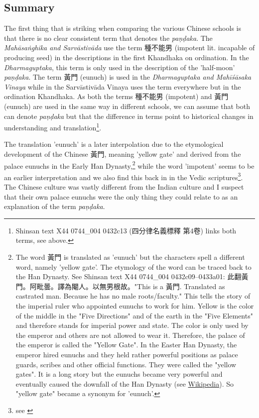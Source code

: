 \subsection{Summary}
The first thing that is striking when comparing the various Chinese schools is that there is no clear consistent term that denotes the {\em paṇḍaka}. The {\em Mahāsaṅghika and Sarvāstivāda} use the term 種不能男 (impotent lit. incapable of producing seed) in the descriptions in the first Khandhaka on ordination. In the {\em Dharmaguptaka}, this term is only used in the description of the 'half-moon' {\em paṇḍaka}. The term 黃門 (eunuch) is used in the {\em Dharmaguptaka and Mahīśāsaka Vinaya} while in the Sarvāstivāda Vinaya uses the term everywhere but in the ordination Khandhaka. As both the terms 種不能男 (impotent) and 黃門 (eunuch) are used in the same way in different schools, we can assume that both can denote {\em paṇḍaka} but that the difference in terms point to historical changes in understanding and translation\footnote{Shinsan text X44 0744_004 0432c13 (四分律名義標釋 第4卷) links both terms, see above.}.

The translation 'eunuch' is a later interpolation due to the etymological development of the Chinese 黃門, meaning 'yellow gate' and derived from the palace eunuchs in the Early Han Dynasty,\footnote{The word 黃門 is translated as 'eunuch' but the characters spell a different word, namely 'yellow gate'. The etymology of the word can be traced back to the Han Dynasty. See Shinsan text X44 0744_004 0432c09–0433a01: 此翻黃門。阿毗曇。譯為閹人。以無男根故。"This is a 黃門. Translated as castrated man. Because he has no male roots/faculty." This tells the story of the imperial ruler who appointed eunuchs to work for him. Yellow is the color of the middle in the "Five Directions" and of the earth in the "Five Elements" and therefore stands for imperial power and state. The color is only used by the emperor and others are not allowed to wear it. Therefore, the palace of the emperor is called the "Yellow Gate". In the Easter Han Dynasty, the emperor hired eunuchs and they held rather powerful positions as palace guards, scribes and other official functions. They were called the "yellow gates". It is a long story but the eunuchs became very powerful and eventually caused the downfall of the Han Dynasty (see \href{https://en.wikipedia.org/wiki/Han_dynasty}{Wikipedia}). So "yellow gate" became a synonym for 'eunuch'.} while the word 'impotent' seems to be an earlier interpretation and we also find this back in in the Vedic scriptures\footnote{see \cite{zwilling}}. The Chinese culture was vastly different from the Indian culture and I suspect that their own palace eunuchs were the only thing they could relate to as an explanation of the term {\em paṇḍaka}.

